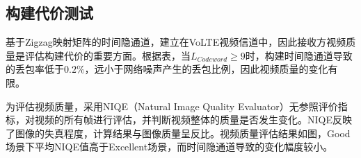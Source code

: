 \subsection{构建代价测试}
\label{chap:zigzag:results:cost}


基于Zigzag映射矩阵的时间隐通道，建立在VoLTE视频信道中，因此接收方视频质量是评估构建代价的重要方面。根据表，当$L_{Codeword}\ge 9$时，构建时间隐通道导致的丢包率低于$0.2\%$，远小于网络噪声产生的丢包比例，因此视频质量的变化有限。

为评估视频质量，采用NIQE（Natural Image Quality Evaluator）无参照评价指标，对视频的所有帧进行评估，并判断视频整体的质量是否发生变化。NIQE反映了图像的失真程度，计算结果与图像质量呈反比。视频质量评估结果如图，Good场景下平均NIQE值高于Excellent场景，而时间隐通道导致的变化幅度较小。

